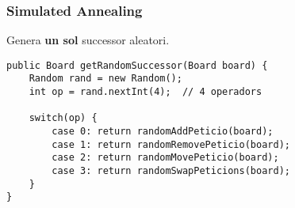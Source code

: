 \subsubsection{Simulated Annealing}
Genera \textbf{un sol} successor aleatori.

\begin{lstlisting}[caption={Generació de successors per SA}, label={lst:sa-gen}]
public Board getRandomSuccessor(Board board) {
    Random rand = new Random();
    int op = rand.nextInt(4);  // 4 operadors
    
    switch(op) {
        case 0: return randomAddPeticio(board);
        case 1: return randomRemovePeticio(board);
        case 2: return randomMovePeticio(board);
        case 3: return randomSwapPeticions(board);
    }
}
\end{lstlisting}
